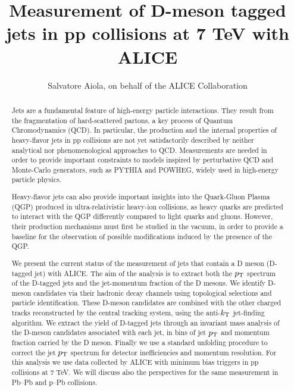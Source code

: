 \documentclass[a4paper]{jpconf}
\begin{document}
\title{Measurement of D-meson tagged jets in pp collisions at 7 TeV with ALICE}

\author{Salvatore Aiola, on behalf of the ALICE Collaboration}

\address{Physics Department, Yale University, 266 Whitney Avenue, New Haven, CT 06511}


\begin{abstract}
Jets are a fundamental feature of high-energy particle interactions. 
They result from the fragmentation of hard-scattered partons, 
a key process of Quantum Chromodynamics (QCD). 
In particular, the production and the internal properties of heavy-flavor jets 
in pp collisions are not yet satisfactorily described by neither analytical nor 
phenomenological approaches to QCD. Measurements are needed
in order to provide important constraints to models inspired by perturbative QCD 
and Monte-Carlo generators, such as PYTHIA and POWHEG, widely used in high-energy particle physics.

Heavy-flavor jets can also provide important insights into the Quark-Gluon Plasma (QGP)
produced in ultra-relativistic heavy-ion collisions, as heavy quarks are predicted
to interact with the QGP differently compared to light quarks and gluons. 
However, their production mechanisms must first be studied in the vacuum, 
in order to provide a baseline for the observation of possible modifications induced by the presence of the QGP. 

We present the current status of the measurement of jets that contain a D meson (D-tagged jet) with \mbox{ALICE}.
The aim of the analysis is to extract both the $p_{\rm T}$ spectrum of the D-tagged jets and the jet-momentum fraction of the D mesons. 
We identify D-meson candidates via their hadronic decay channels using topological selections and particle identification.
These D-meson candidates are combined with the other charged tracks reconstructed by the central tracking system, 
using the anti-$k_{\rm T}$ jet-finding algorithm.
We extract the yield of D-tagged jets through an invariant mass analysis of the D-meson candidates associated with each jet, 
in bins of jet $p_{\rm T}$ and momentum fraction carried by the D meson. Finally we use a standard unfolding procedure 
to correct the jet $p_{\rm T}$ spectrum for detector inefficiencies and momentum resolution. For this analysis we use data collected
by ALICE with minimum bias triggers in pp collisions at 7 TeV. We will discuss also
the perspectives for the same measurement in Pb--Pb and p--Pb collisions.
\end{abstract}
\end{document}
